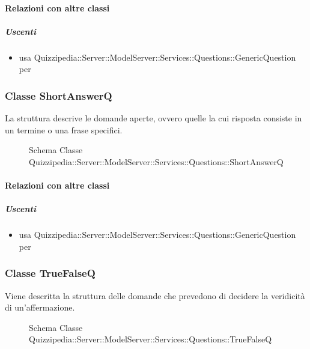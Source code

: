 \paragraph{Relazioni con altre classi}
\subparagraph{Uscenti}
\begin{itemize}
\item usa Quizzipedia::Server::ModelServer::Services::Questions::GenericQuestion per 
\end{itemize}
\subsubsection{Classe ShortAnswerQ}
La struttura descrive le domande aperte, ovvero quelle la cui risposta consiste in un termine o una frase specifici.
\begin{figure}[H]
\centering
\noindent{}
\caption[Schema Classe ShortAnswerQ]{Schema Classe Quizzipedia::Server::ModelServer::Services::Questions::ShortAnswerQ}
\end{figure}
\paragraph{Relazioni con altre classi}
\subparagraph{Uscenti}
\begin{itemize}
\item usa Quizzipedia::Server::ModelServer::Services::Questions::GenericQuestion per 
\end{itemize}
\subsubsection{Classe TrueFalseQ}
Viene descritta la struttura delle domande che prevedono di decidere la veridicità di un'affermazione.
\begin{figure}[H]
\centering
\noindent{}
\caption[Schema Classe TrueFalseQ]{Schema Classe Quizzipedia::Server::ModelServer::Services::Questions::TrueFalseQ}
\end{figure}
